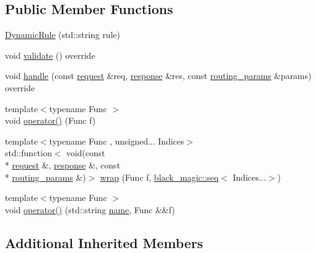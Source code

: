 \subsection*{Public Member Functions}
\begin{DoxyCompactItemize}
\item 
\hyperlink{classcrow_1_1_dynamic_rule_ae34a9eac492ec9ed8e7c7ef036afcfec}{Dynamic\-Rule} (std\-::string rule)
\item 
void \hyperlink{classcrow_1_1_dynamic_rule_ad044e4cacd82591b1d9b1115f0d0bea1}{validate} () override
\item 
void \hyperlink{classcrow_1_1_dynamic_rule_ae36fa601f18c2c181804132528443c9f}{handle} (const \hyperlink{structcrow_1_1request}{request} \&req, \hyperlink{structcrow_1_1response}{response} \&res, const \hyperlink{structcrow_1_1routing__params}{routing\-\_\-params} \&params) override
\item 
{\footnotesize template$<$typename Func $>$ }\\void \hyperlink{classcrow_1_1_dynamic_rule_a482a85c52b9815f5e0715e0840ab7024}{operator()} (Func f)
\item 
{\footnotesize template$<$typename Func , unsigned... Indices$>$ }\\std\-::function$<$ void(const \\*
\hyperlink{structcrow_1_1request}{request} \&, \hyperlink{structcrow_1_1response}{response} \&, const \\*
\hyperlink{structcrow_1_1routing__params}{routing\-\_\-params} \&)$>$ \hyperlink{classcrow_1_1_dynamic_rule_af9bdb952a3688fb2c127104962243a9f}{wrap} (Func f, \hyperlink{structcrow_1_1black__magic_1_1seq}{black\-\_\-magic\-::seq}$<$ Indices...$>$)
\item 
{\footnotesize template$<$typename Func $>$ }\\void \hyperlink{classcrow_1_1_dynamic_rule_a8c18b9fad80fd47934051f41286a4a9e}{operator()} (std\-::string \hyperlink{structcrow_1_1_rule_parameter_traits_aa330efc6368bb7b66901122f1e8e4943}{name}, Func \&\&f)
\end{DoxyCompactItemize}
\subsection*{Additional Inherited Members}



